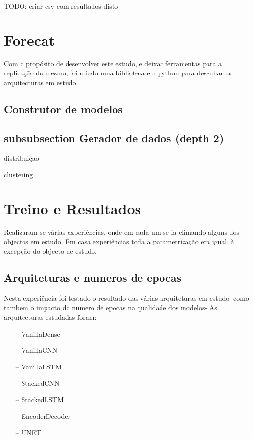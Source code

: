 TODO: criar csv com resultados disto

\section{Forecat  \label{se:dados_estudo}}

Com o propósito de desenvolver este estudo, e deixar ferramentas para a replicação do mesmo, foi criado uma biblioteca em python para desenhar as arquitecturas em estudo.


\subsection{Construtor de modelos}


\subsection{subsubsection Gerador de dados (depth 2)}
distribuiçao

clustering


\section{Treino e Resultados  \label{se:dados_estudo}}

Realizaram-se várias experiências, onde em cada um se ia elimando alguns dos objectos em estudo.
Em casa experiências toda a parametrização era igual, à excepção do objecto de estudo.

\subsection{Arquiteturas e numeros de epocas}

Nesta experiência foi testado o resultado das várias arquiteturas em estudo, como tambem o impacto do numero de epocas na qualidade dos modelos-
As arquitecturas estudadas foram:

\begin{itemize}
    \item[--] VanillaDense
    \item[--] VanillaCNN
    \item[--] VanillaLSTM
    \item[--] StackedCNN
    \item[--] StackedLSTM
    \item[--] EncoderDecoder
    \item[--] UNET
\end{itemize}

